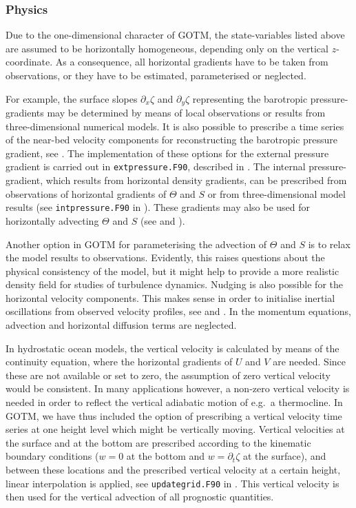 \subsubsection{Physics}\label{sec:meanflowIntroPhysics}
Due to the one-dimensional character of GOTM, the state-variables
listed above are assumed to be horizontally homogeneous, depending
only on the vertical $z$-coordinate. As a consequence, all 
horizontal gradients have to be taken from observations, or they have
to be estimated, parameterised or neglected.

For example, the surface slopes $\partial_x\zeta$ and
$\partial_y\zeta$ representing the barotropic pressure-gradients may
be determined by means of local observations or results from
three-dimensional numerical models. It is also possible to prescribe a
time series of the near-bed velocity components for reconstructing the
barotropic pressure gradient, see \cite{Burchard99}.  The
implementation of these options for the external pressure gradient is
carried out in {\tt extpressure.F90}, described in
.  The internal pressure-gradient, which results
from horizontal density gradients, can be prescribed from observations
of horizontal gradients of $\Theta$ and $S$ or from three-dimensional
model results (see {\tt intpressure.F90} in ).
These gradients may also be used for horizontally advecting $\Theta$
and $S$ (see  and ).

Another option in GOTM for parameterising the advection of $\Theta$
and $S$ is to relax the model results to observations. Evidently, this
raises questions about the physical consistency of the model, but it
might help to provide a more realistic density field for studies of
turbulence dynamics.  Nudging is also possible for the horizontal
velocity components.  This makes sense in order to initialise inertial
oscillations from observed velocity profiles, see 
and .  In the momentum equations, advection and
horizontal diffusion terms are neglected.

In hydrostatic ocean models, the vertical velocity is calculated by
means of the continuity equation, where the horizontal gradients of
$U$ and $V$ are needed. Since these are not available or set to zero,
the assumption of zero vertical velocity would be consistent.  In many
applications however, a non-zero vertical velocity is needed in order
to reflect the vertical adiabatic motion of e.g.\ a thermocline.  In
GOTM, we have thus included the option of prescribing a vertical
velocity time series at one height level which might be vertically
moving.  Vertical velocities at the surface and at the bottom are
prescribed according to the kinematic boundary conditions ($w=0$ at
the bottom and $w=\partial_t\zeta$ at the surface), and between these
locations and the prescribed vertical velocity at a certain height,
linear interpolation is applied, see {\tt updategrid.F90} in
.  This vertical velocity is then used for the
vertical advection of all prognostic quantities.

